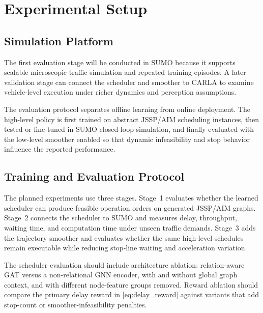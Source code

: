 \section{Experimental Setup}
\label{sec:experimental_setup}

\subsection{Simulation Platform}
The first evaluation stage will be conducted in SUMO because it supports scalable microscopic traffic simulation and repeated training episodes. A later validation stage can connect the scheduler and smoother to CARLA to examine vehicle-level execution under richer dynamics and perception assumptions.

\begin{addedblock}
The evaluation protocol separates offline learning from online deployment. The high-level policy is first trained on abstract JSSP/AIM scheduling instances, then tested or fine-tuned in SUMO closed-loop simulation, and finally evaluated with the low-level smoother enabled so that dynamic infeasibility and stop behavior influence the reported performance.
\end{addedblock}

\subsection{Training and Evaluation Protocol}
\begin{addedblock}
The planned experiments use three stages. Stage~1 evaluates whether the learned scheduler can produce feasible operation orders on generated JSSP/AIM graphs. Stage~2 connects the scheduler to SUMO and measures delay, throughput, waiting time, and computation time under unseen traffic demands. Stage~3 adds the trajectory smoother and evaluates whether the same high-level schedules remain executable while reducing stop-line waiting and acceleration variation.
\end{addedblock}

\begin{addedtwoblock}
The scheduler evaluation should include architecture ablation: relation-aware GAT versus a non-relational GNN encoder, with and without global graph context, and with different node-feature groups removed. Reward ablation should compare the primary delay reward in \eqref{eq:delay_reward} against variants that add stop-count or smoother-infeasibility penalties.
\end{addedtwoblock}


